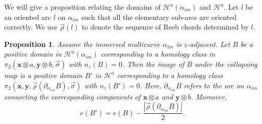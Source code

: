 \documentclass{amsart}
\newtheorem{prop}[thm]{Proposition}
\theoremstyle{definition}
\theoremstyle{remark}
\numberwithin{equation}{section}
\numberwithin{equation}{section} \makeatletter
\begin{document}
We will give a proposition relating the domains of $\mathcal{H}^a(\alpha_{im})$ and $\mathcal{H}^a$. Let $l$ be an oriented arc $l$ on $\alpha_{im}$ such that all the elementary sub-arcs are oriented correctly. We use $\overrightarrow{\rho}(l)$ to denote the sequence of Reeb chords determined by $l$.
\begin{prop}\label{Proposition, relating domains in two different Heegaard diagrams}
Assume the immersed multicurve $\alpha_{im}$ is $z$-adjacent. Let $B$ be a positive domain in $\mathcal{H}^a(\alpha_{im})$ corresponding to a homology class in $\pi_2(\bm{x}\otimes a, \bm{y}\otimes b, \overrightarrow{\sigma})$ with $n_z(B)=0$. Then the image of $B$ under the collapsing map is a positive domain $B'$ in $\mathcal{H}^a$ corresponding to a homology class $\pi_2(\bm{x},\bm{y},\overrightarrow{\rho}(\partial_{\alpha_{im}}B),\overrightarrow{\sigma})$ with $n_z(B')=0$. Here, $\partial_{\alpha_{im}}B$ refers to the arc on $\alpha_{im}$ connecting the corresponding components of $\bm{x}\otimes a$ and $\bm{y}\otimes b$. Moreover, $$e(B')=e(B)-\frac{|\overrightarrow{\rho}(\partial_{\alpha_{im}}B)|}{2}.$$    
\end{prop}
\end{document}
